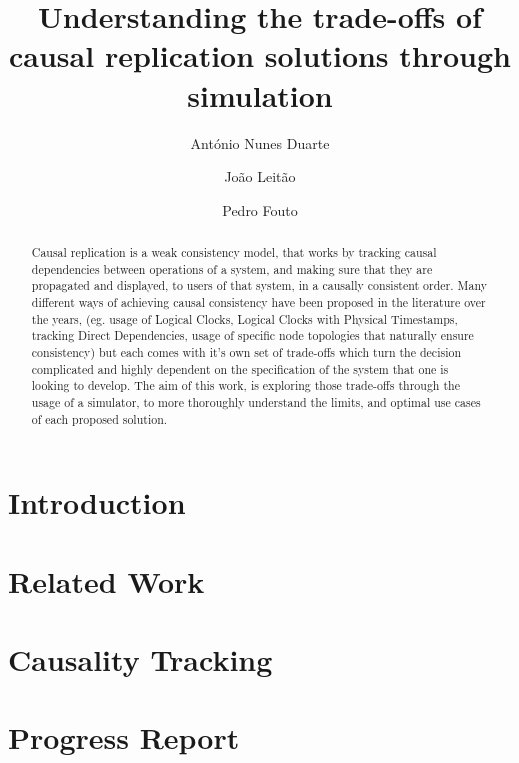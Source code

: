 \documentclass[runningheads]{llncs}
\begin{document}
%
\title{Understanding the trade-offs of causal replication solutions through simulation}
%
%
\author{António Nunes Duarte \and
João Leitão \and
Pedro Fouto}
%
%
%
\maketitle              %
%
\begin{abstract}
Causal replication is a weak consistency model, that works by 
tracking causal dependencies between operations of a system, and making sure that they are propagated
and displayed, to users of that system, in a causally consistent order.
Many different ways of achieving causal consistency have been proposed in the literature
over the years, (eg. usage of Logical Clocks\cite{baquero2016logical}, 
Logical Clocks with Physical Timestamps\cite{roohitavaf2017causalspartan,du2014gentlerain}, tracking Direct Dependencies\cite{lloyd2011don}, 
usage of specific node topologies that naturally ensure consistency\cite{van2020intrinsic})
but each comes with it's own set of trade-offs which turn the decision complicated 
and	highly dependent on the specification of the system that one is looking to develop. The aim of this work, is 
exploring those trade-offs through the usage of a simulator, to more thoroughly understand the limits,
and optimal use cases of each proposed solution.

\end{abstract}

\section{Introduction}

\section{Related Work}

\section{Causality Tracking}

\section{Progress Report}

%
%
%
% 
% 
%



\end{document}
